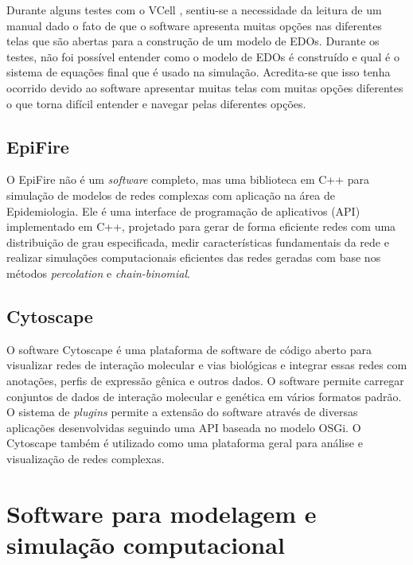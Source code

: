 \documentclass[
	12pt,				%
	openright,			%
	oneside,			%
	a4paper,			%
	main=brazil,
	english,			%
	]{ufsj-abntex2}
\begin{document}
Durante alguns testes com o VCell \cite{vcell,VCellref1}, sentiu-se a necessidade da leitura de um manual dado o fato de que o software apresenta muitas opções nas diferentes telas que são abertas para a construção de um modelo de EDOs. Durante os testes, não foi possível entender como o modelo de EDOs é construído e qual é o sistema de equações final que é usado na simulação. Acredita-se que isso tenha ocorrido devido ao software apresentar muitas telas com muitas opções diferentes o que torna difícil entender e navegar pelas diferentes opções. 

\section{EpiFire}

O EpiFire \cite{epifire} não é um \textit{software} completo, mas uma biblioteca em C++ para simulação de modelos de redes complexas com aplicação na área de Epidemiologia. Ele é uma interface de programação de aplicativos (API) implementado em C++, projetado para gerar de forma eficiente redes com uma distribuição de grau especificada, medir características fundamentais da rede e realizar simulações computacionais eficientes das redes geradas com base nos métodos \textit{percolation} e \textit{chain-binomial}. 

\section{Cytoscape}

O software Cytoscape \cite{shannon2003cytoscape} é uma plataforma de software de código aberto para visualizar redes de interação molecular e vias biológicas e integrar essas redes com anotações, perfis de expressão gênica e outros dados. O software permite carregar conjuntos de dados de interação molecular e genética em vários formatos padrão. O sistema de \textit{plugins} permite a extensão do software através de diversas aplicações desenvolvidas seguindo uma API baseada no modelo OSGi. O Cytoscape também é utilizado como uma plataforma geral para análise e visualização de redes complexas. 




\chapter{Software para modelagem e simulação computacional}
\label{chap:metodologia}
\label{chap:software-para-modelagem}
\end{document}
